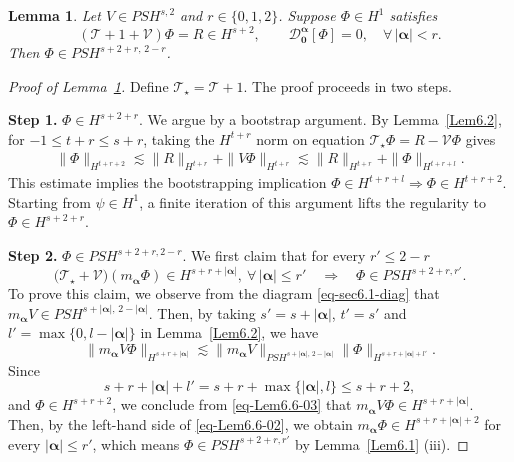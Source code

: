 \documentclass{sn-jnl}%
\numberwithin{equation}{section}
\theoremstyle{thmstyleone}%
\newtheorem{lemma}{Lemma}[section]%
\theoremstyle{thmstyletwo}%
\theoremstyle{thmstylethree}%
\begin{document}
\begin{lemma}\label{Lem6.6}
Let $V \in PSH^{s,2}$ and $r \in \{0,1,2\}$. 
Suppose $\Phi \in H^1$ satisfies
\begin{equation}
(\mathcal{T}+1+\mathcal{V})\Phi = R \in H^{s+2}, 
\qquad 
\mathcal{D}_{\bm 0}^{\bm \alpha}[\Phi] = 0, \quad \forall\, |\bm \alpha| < r.
\end{equation}
Then $\Phi \in PSH^{s+2+r,\,2-r}$.
\end{lemma}
\begin{proof}[Proof of Lemma~\ref{Lem6.6}]
    Define $\mathcal{T}_{\star}=\mathcal{T}+1$. The proof proceeds in two steps.
    
    \textbf{Step 1.} $\Phi \in H^{s+2+r}$.
        We argue by a bootstrap argument. By Lemma~\ref{Lem6.2}, for $-1\leq t+r\leq s+r$, taking the $H^{t+r}$ norm on equation 
        $
        \mathcal{T}_{\star}\Phi = R - \mathcal{V}\Phi
        $
        gives
        \begin{equation}\label{eq-Lem6.6-01}
        \begin{aligned}
          \|\Phi\|_{H^{t+r+2}} \lesssim \|R\|_{H^{t+r}}+\|V\Phi\|_{H^{t+r}}
          \lesssim \|R\|_{H^{t+r}} + \|\Phi\|_{H^{t+r+l}}.
        \end{aligned}
        \end{equation}
        This estimate implies the bootstrapping implication
        $
        \Phi \in H^{t+r+l} \Longrightarrow \Phi\in H^{t+r+2}
        $.
        Starting from $\psi \in H^{1}$, a finite iteration of this argument lifts the regularity to $\Phi \in H^{s+2+r}$.
        
    \textbf{Step 2.} $\Phi \in PSH^{s+2+r,2-r}$. We first claim that for every $r'\leq 2-r$
        \begin{equation}\label{eq-Lem6.6-02}
        \bigl(\mathcal{T}_{\star}+\mathcal{V}\bigr)(m_{\bm \alpha}\Phi) \in H^{s+r+|\bm \alpha|},\ \forall\, |\bm \alpha|\leq r' 
        \quad \Longrightarrow \quad \Phi\in PSH^{s+2+r,r'}.
        \end{equation}To prove this claim, we observe from the diagram \eqref{eq-sec6.1-diag} that $m_{\bm \alpha}V \in PSH^{s+|\bm \alpha|,\,2-|\bm \alpha|}$. Then, by taking $s' = s+|\bm \alpha|$, $t' = s'$ and $l' = \max\{0,l-|\bm \alpha|\}$ in Lemma~\ref{Lem6.2}, we have
        \begin{equation}\label{eq-Lem6.6-03}
        \|m_{\bm \alpha}V\Phi\|_{H^{s+r+|\bm \alpha|}}
        \lesssim
        \|m_{\bm \alpha}V\|_{PSH^{s+|\bm \alpha|,\,2-|\bm \alpha|}}
        \|\Phi\|_{H^{s+r+|\bm \alpha|+l'}}.
        \end{equation}
        Since
        \[
        s+r+|\bm \alpha|+l'
        =
        s+r+\max\{|\bm \alpha|,l\}
        \le
        s+r+2,
        \]
        and $\Phi\in H^{s+r+2}$, we conclude from \eqref{eq-Lem6.6-03} that $m_{\bm \alpha}V\Phi \in H^{s+r+|\bm \alpha|}$.
        Then, by the left-hand side of \eqref{eq-Lem6.6-02}, we obtain
        $m_{\bm \alpha}\Phi \in H^{s+r+|\bm \alpha|+2}$ for every $|\bm \alpha|\leq r'$, which means $\Phi \in PSH^{s+2+r,r'}$ by Lemma~\ref{Lem6.1} (iii).
    

\end{proof}
\end{document}
